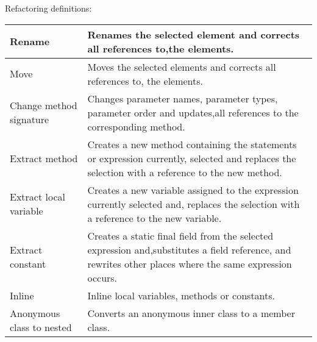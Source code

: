 Refactoring definitions:

\begin{table}[h]
\begin{tabular}{p{3cm} p{11 cm}}
Rename                              & Renames the selected element and corrects all references to,the elements.                                                                                                                                 \\ \hline
Move                                & Moves the selected elements and corrects all references to, the elements.                                                                                                                                 \\ \hline
Change method signature             & Changes parameter names, parameter types, parameter order and updates,all references to the corresponding method.                                                                                         \\ \hline
Extract method                      & Creates a new method containing the statements or expression currently, selected and replaces the selection with a reference to the new method.                                                           \\ \hline
Extract local variable              & Creates a new variable assigned to the expression currently selected and, replaces the selection with a reference to the new variable.                                                                    \\ \hline
Extract constant                    & Creates a static final field from the selected expression and,substitutes a field reference, and rewrites other places where the same expression occurs.                                                  \\ \hline
Inline                              & Inline local variables, methods or constants.                                                                                                                                                             \\ \hline
Anonymous class to nested           & Converts an anonymous inner class to a member class.                                                                                                                                                      \\ \hline

\end{tabular}
\end{table}
